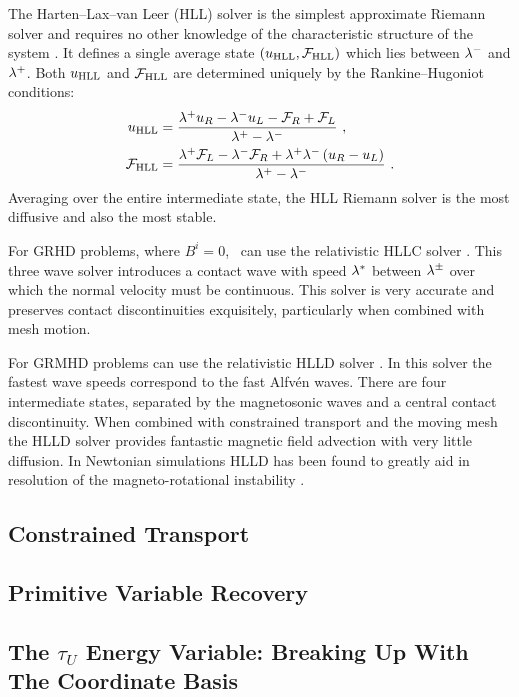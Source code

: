 The Harten--Lax--van Leer (HLL) solver is the simplest approximate Riemann solver and requires no other knowledge of the characteristic structure of the system \citep{HLL}.  It defines a single average state $(u_{\rm HLL}, \mathcal{F}_{\rm HLL})$ which lies between $\lambda^-$ and $\lambda^+$.  Both $u_{\rm HLL}$ and  $\mathcal{F}_{\rm HLL}$ are determined uniquely by the Rankine--Hugoniot conditions:
\begin{align}
	u_{\rm HLL} &= \frac{\lambda^+ u_R - \lambda^- u_L - \mathcal{F}_R + \mathcal{F}_L}{\lambda^+ - \lambda^-}\ , \\
	\mathcal{F}_{\rm HLL} &= \frac{\lambda^+ \mathcal{F}_L - \lambda^- \mathcal{F}_R +\lambda^+\lambda^-\left(u_R-u_L\right)}{\lambda^+ - \lambda^-}\ . \\
\end{align}
Averaging over the entire intermediate state, the HLL Riemann solver is the most diffusive and also the most stable.  

For GRHD problems, where $B^i = 0$, \grdisco\ can use the relativistic HLLC solver \citep{Toro94, Mignone05}.  This three wave solver introduces a contact wave with speed $\lambda^*$ between $\lambda^\pm$ over which the normal velocity must be continuous.  This solver is very accurate and preserves contact discontinuities exquisitely, particularly when combined with mesh motion.

For GRMHD problems \grdisco can use the relativistic HLLD solver \citep{HLLD,Mignone09}.  In this solver the fastest wave speeds correspond to the fast Alfv\'{e}n waves.  There are four intermediate states, separated by the magnetosonic waves and a central contact discontinuity.  When combined with constrained transport and the moving mesh the HLLD solver provides fantastic magnetic field advection with very little diffusion.  In Newtonian simulations HLLD has been found to greatly aid in resolution of the magneto-rotational instability \citep{Sorathia12}.

\subsection{Constrained Transport}

\subsection{Primitive Variable Recovery}


\subsection{The $\tau_U$ Energy Variable: Breaking Up With The Coordinate Basis}

